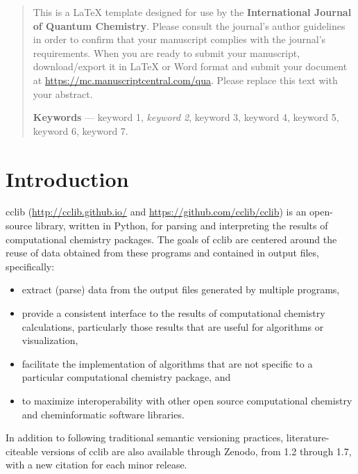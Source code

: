 \documentclass[num-refs]{wiley-article}
\begin{document}
\maketitle
{}
\begin{abstract}
This is a LaTeX template designed for use by the \textbf{International Journal of Quantum Chemistry}. Please consult the journal's author guidelines in order to confirm that your manuscript complies with the journal's requirements. When you are ready to submit your manuscript, download/export it in LaTeX or Word format and submit your document at \href{https://mc.manuscriptcentral.com/qua}{https://mc.manuscriptcentral.com/qua}. Please replace this text with your abstract.

\textbf{Keywords} --- keyword 1, \emph{keyword 2}, keyword 3, keyword 4, keyword 5, keyword 6, keyword 7.
\end{abstract}

\section{Introduction}

cclib\cite{Oboyle2008} (\url{http://cclib.github.io/} and \url{https://github.com/cclib/cclib}) is an open-source library, written in Python, for parsing and interpreting the results of computational chemistry packages.  The goals of cclib are centered around the reuse of data obtained from these programs and contained in output files, specifically:
\begin{itemize}
\item extract (parse) data from the output files generated by multiple programs,
\item provide a consistent interface to the results of computational chemistry calculations, particularly those results that are useful for algorithms or visualization,
\item facilitate the implementation of algorithms that are not specific to a particular computational chemistry package, and
\item to maximize interoperability with other open source computational chemistry and cheminformatic software libraries.
\end{itemize}

In addition to following traditional semantic versioning practices, literature-citeable versions of cclib are also available through Zenodo, from 1.2\cite{Langner2014} through 1.7\cite{Berquist2021}, with a new citation for each minor release.
\end{document}

